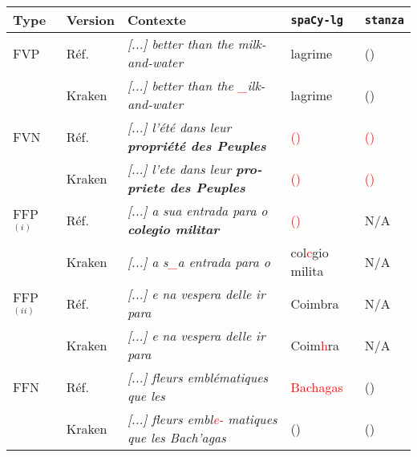 \scriptsize{
\begin{tabular}{|l|l|l|l|l|}
\hline
Type &Version & Contexte & \texttt{spaCy-lg} &\texttt{stanza}\\
\hline
\hline
FVP&Réf. &\textit{[...] better than the milk-and-water}& lagrime  & ()\\
&Kraken &\textit{[...] better than the \textcolor{red}{\_}ilk-
and-water}& lagrime  & () \\
\hline
FVN&Réf. & \textit{[...] l'été dans leur \textbf{propriété des Peuples}}& \textcolor{red}{()}  &\textcolor{red}{()} \\
&Kraken &\textit{[...] l'ete dans leur \textbf{pro-
priete des Peuples}}& \textcolor{red}{()}  & \textcolor{red}{()}\\
\hline
\hline
FFP $^{(i)}$&Réf. &\textit{[...] a sua entrada para o \textbf{colegio militar}}& \textcolor{red}{()}  & N/A\\
&Kraken &\textit{[...] a s\textcolor{red}{\_}a entrada para
o }& col\textcolor{red}{c}gio milita  &N/A \\
FFP $^{(ii)}$&Réf. & \textit{[...] e na vespera delle ir para}
&Coimbra& N/A\\
&Kraken & \textit{[...] e na vespera delle ir para} &Coim\textcolor{red}{h}ra& N/A\\
\hline
FFN&Réf. & \textit{[...] fleurs emblématiques que les }& \textcolor{red}{Bachagas} &() \\
&Kraken & \textit{[...] fleurs embl\textcolor{red}{e-}
matiques que les Bach'agas}& () &() \\
\hline
\end{tabular}}
